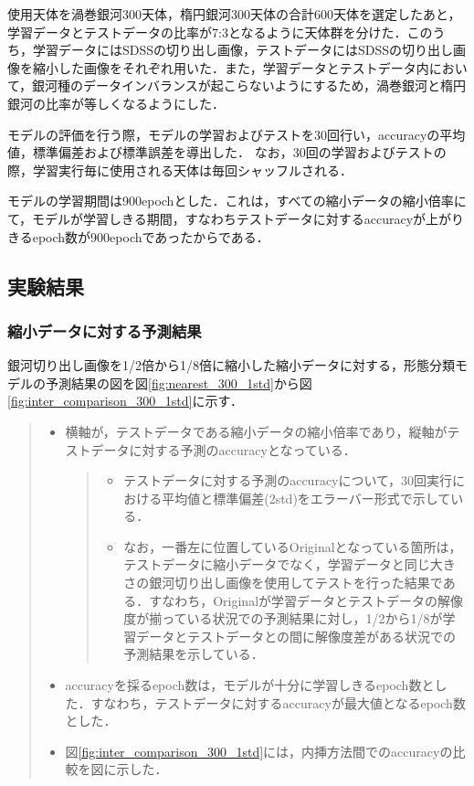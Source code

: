 \documentclass[a4j, 11pt]{jreport}
\begin{document}
使用天体を渦巻銀河300天体，楕円銀河300天体の合計600天体を選定したあと，学習データとテストデータの比率が7:3となるように天体群を分けた．このうち，学習データにはSDSSの切り出し画像，テストデータにはSDSSの切り出し画像を縮小した画像をそれぞれ用いた．また，学習データとテストデータ内において，銀河種のデータインバランスが起こらないようにするため，渦巻銀河と楕円銀河の比率が等しくなるようにした．

モデルの評価を行う際，モデルの学習およびテストを30回行い，accuracyの平均値，標準偏差および標準誤差を導出した．
なお，30回の学習およびテストの際，学習実行毎に使用される天体は毎回シャッフルされる．

モデルの学習期間は900epochとした．これは，すべての縮小データの縮小倍率にて，モデルが学習しきる期間，すなわちテストデータに対するaccuracyが上がりきるepoch数が900epochであったからである．

\subsection{実験結果}
\subsubsection{縮小データに対する予測結果}
銀河切り出し画像を1/2倍から1/8倍に縮小した縮小データに対する，形態分類モデルの予測結果の図を図\ref{fig:nearest_300_1std}から図\ref{fig:inter_comparison_300_1std}に示す．

\begin{quote}
 \begin{itemize}
  \item 横軸が，テストデータである縮小データの縮小倍率であり，縦軸がテストデータに対する予測のaccuracyとなっている．
  \begin{quote}
   \begin{itemize}
    \item テストデータに対する予測のaccuracyについて，30回実行における平均値と標準偏差(2std)をエラーバー形式で示している．
    \item なお，一番左に位置しているOriginalとなっている箇所は，テストデータに縮小データでなく，学習データと同じ大きさの銀河切り出し画像を使用してテストを行った結果である．すなわち，Originalが学習データとテストデータの解像度が揃っている状況での予測結果に対し，1/2から1/8が学習データとテストデータとの間に解像度差がある状況での予測結果を示している．
   \end{itemize}
  \end{quote}
  \item accuracyを採るepoch数は，モデルが十分に学習しきるepoch数とした．すなわち，テストデータに対するaccuracyが最大値となるepoch数とした．
  \item 図\ref{fig:inter_comparison_300_1std}には，内挿方法間でのaccuracyの比較を図に示した．
 \end{itemize}
\end{quote}
\end{document}

